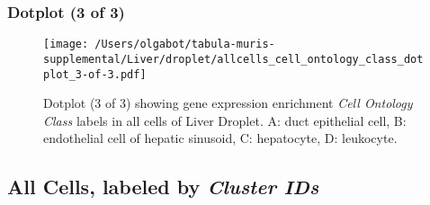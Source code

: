\clearpage

\subsubsection{Dotplot (3 of 3)}
\begin{figure}[h]
\centering
\texttt{[image: /Users/olgabot/tabula-muris-supplemental/Liver/droplet/allcells\_cell\_ontology\_class\_dotplot\_3-of-3.pdf]}

\caption{ Dotplot (3 of 3)  showing gene expression enrichment \emph{Cell Ontology Class} labels in all cells of Liver Droplet. A: duct epithelial cell, B: endothelial cell of hepatic sinusoid, C: hepatocyte, D: leukocyte.}
\end{figure}


\clearpage

\subsection{All Cells, labeled by \emph{Cluster IDs}}
